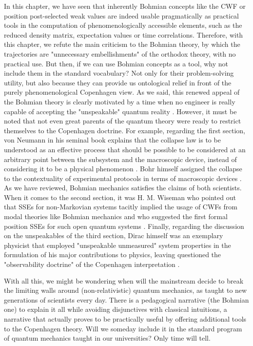 \documentclass[11pt, a4paper]{article} %
\begin{document}
In this chapter, we have seen that inherently Bohmian concepts like the CWF or position post-selected weak values are indeed usable pragmatically as practical tools in the computation of phenomenologically accessible elements, such as the reduced density matrix, expectation values or time correlations. Therefore, with this chapter, we refute the main criticism to the Bohmian theory, by which the trajectories are "unnecessary embellishments" of the orthodox theory, with no practical use. But then, if we can use Bohmian concepts as a tool, why not include them in the standard vocabulary? Not only for their problem-solving utility, but also because they can provide us ontological relief in front of the purely phenomenological Copenhagen view. As we said, this renewed appeal of the Bohmian theory is clearly motivated by a time when no engineer is really capable of accepting the "unspeakable" quantum reality \cite{where, consp}. However, it must be noted that not even great parents of the quantum theory were ready to restrict themselves to the Copenhagen doctrine. For example, regarding the first section, von Neumann in his seminal book \cite{vonNeumann} explains that the collapse law is to be understood as an effective process that should be possible to be considered at an arbitrary point between the subsystem and the macroscopic device, instead of considering it to be a physical phenomenon \cite{NeumannNoCollapse}. Bohr himself assigned the collapse to the contextuality of experimental protocols \cite{Dirac} in terms of macroscopic devices \cite{Bohr}. As we have reviewed, Bohmian mechanics satisfies the claims of both scientists. When it comes to the second section, it was H. M. Wiseman who pointed out that SSEs for non-Markovian systems tacitly implied the usage of CWFs from modal theories like Bohmian mechanics \cite{interpretSSE, NMisModal} and who suggested the first formal position SSEs for such open quantum systems \cite{WisemanSSE}. Finally, regarding the discussion on the unspeakables of the third section, Dirac himself was an exemplary physicist that employed "unspeakable unmeasured" system properties in the formulation of his major contributions to physics, leaving questioned the "observability doctrine" of the Copenhagen interpretation \cite{Dirac}.

With all this, we might be wondering when will the mainstream decide to break the limiting walls around (non-relativistic) quantum mechanics, as taught to new generations of scientists every day. There is a pedagogical narrative (the Bohmian one) to explain it all while avoiding disjunctives with classical intuitions, a narrative that actually proves to be practically useful by offering additional tools to the Copenhagen theory. Will we someday include it in the standard program of quantum mechanics taught in our universities? Only time will tell.
\vspace{-0.2cm}

{
%
\printbibliography
%
}
\end{document}
